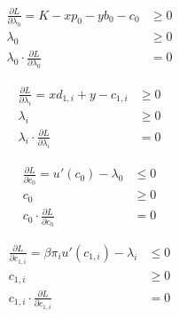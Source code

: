 \begin{minipage}{0.48\textwidth}
    \begin{subequations}\label{eq:lagr2,lambda_0}
    \begin{align}
        \frac{\partial L}{\partial \lambda_0} = K - xp_0 - yb_0 - c_0 & \geq 0 \\
        \lambda_0 & \geq 0 \\
        \lambda_0 \cdot \frac{\partial L}{\partial \lambda_0} & = 0
    \end{align}
    \end{subequations}
\end{minipage}
\begin{minipage}{0.48\textwidth}
    \begin{subequations}\label{eq:lagr2,lambda_i}
    \begin{align}
        \frac{\partial L}{\partial \lambda_i} = x d_{1,i} + y - c_{1,i} & \geq 0\\
        \lambda_i & \geq 0\\
        \lambda_i \cdot \frac{\partial L}{\partial \lambda_i} & = 0
    \end{align}
    \end{subequations}    
\end{minipage}

\bigskip

\begin{minipage}{0.48\textwidth}
    \begin{subequations}\label{eq:lagr2,c_0}
    \begin{align}
        \frac{\partial L}{\partial c_0} = u'(c_0) - \lambda_0 & \leq 0\\
        c_0 & \geq 0 \\
        c_0 \cdot \frac{\partial L}{\partial c_0} & = 0
    \end{align}
    \end{subequations}
\end{minipage}\hfill
\begin{minipage}{0.48\textwidth}
    \begin{subequations}\label{eq:lagr2,c_i}
    \begin{align}
        \frac{\partial L}{\partial c_{1,i}} = \beta \pi_i u'(c_{1,i}) - \lambda_i & \leq 0\\
        c_{1,i} & \geq 0 \\
        c_{1,i} \cdot \frac{\partial L}{\partial c_{1,i}} & = 0
    \end{align}
    \end{subequations}    
\end{minipage}\hfill

